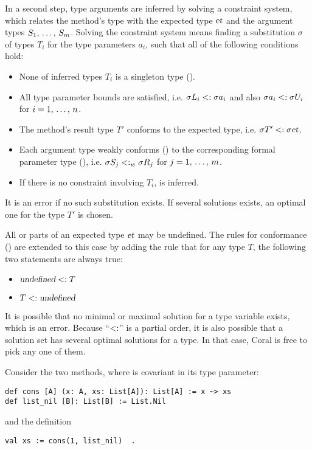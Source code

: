 In a second step, type arguments are inferred by solving a constraint system, which relates the method's type with the expected type $\mbox{\sl et}$ and the argument types $S_1 ,\, \ldots ,\, S_m$. Solving the constraint system means finding a substitution $\sigma$ of types $T_i$ for the type parameters $a_i$, such that all of the following conditions hold:
\begin{itemize}
  \item None of inferred types $T_i$ is a singleton type (). %
  \item All type parameter bounds are satisfied, i.e. $\sigma L_i <: \sigma a_i$ and also $\sigma a_i <: \sigma U_i$ for $i = 1 ,\, \ldots ,\, n$. 
  \item The method's result type $T'$ conforms to the expected type, i.e. $\sigma T' <: \sigma \mbox{\sl et}$. 
  \item Each argument type weakly conforms () to the corresponding formal parameter type (), i.e. $\sigma S_j <: _w \sigma R_j$ for $j = 1 ,\, \ldots ,\, m$. 
  \item If there is no constraint involving $T_i$,  is inferred. 
\end{itemize}

It is an error if no such substitution exists. If several solutions exists, an optimal one for the type $T'$ is chosen. 

All or parts of an expected type $\mbox{\sl et}$ may be undefined. The rules for conformance () are extended to this case by adding the rule that for any type $T$, the following two statements are always true:
\begin{itemize}
  \item $\mbox{\sl undefined} <: T$
  \item $T <: \mbox{\sl undefined}$
\end{itemize}

It is possible that no minimal or maximal solution for a type variable exists, which is an error. Because ``$<:$'' is a partial order, it is also possible that a solution set has several optimal solutions for a type. In that case, Coral is free to pick any one of them. 

\example Consider the two methods, where  is covariant in its type parameter:
\begin{lstlisting}
def cons [A] (x: A, xs: List[A]): List[A] := x ~> xs
def list_nil [B]: List[B] := List.Nil
\end{lstlisting}
and the definition
\begin{lstlisting}
val xs := cons(1, list_nil)  .
\end{lstlisting}

